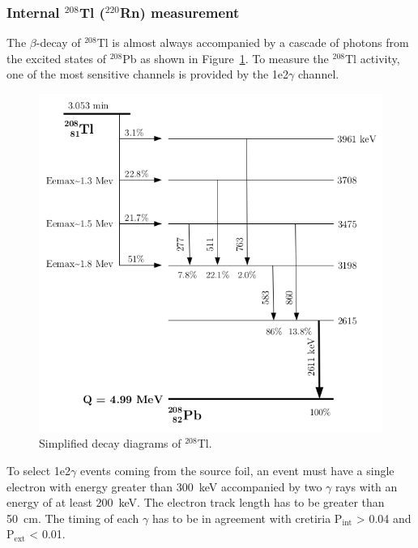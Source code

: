 \documentclass[main.tex]{subfiles}
\begin{document}
\FloatBarrier


\subsubsection{Internal $^{\text{208}}$Tl ($^{\text{220}}$Rn) measurement}


\NI The $\beta$-decay of $^{\text{208}}$Tl is almost always accompanied by a cascade of photons from the excited states of $^{\text{208}}$Pb as shown in Figure~\ref{Tl208-decay-schema}. To measure the $^{\text{208}}$Tl activity, one of the most sensitive channels is provided by the 1e2$\gamma$ channel.


\begin{figure}[h!]
\centering
\includegraphics[scale=0.40]{pictures/Chap6/decay-tl208.png}
\caption{Simplified decay diagrams of $^{\text{208}}$Tl.}
\label{Tl208-decay-schema}
\end{figure}


\NI To select 1e2$\gamma$ events coming from the source foil, an event must have a single electron with energy greater than 300~keV accompanied by two $\gamma$ rays with an energy of at least 200~keV. The electron track length has to be greater than 50~cm. The timing of each $\gamma$ has to be in agreement with cretiria P$_{\text{int}}$ > 0.04 and P$_{\text{ext}}$ < 0.01. 
\end{document}
